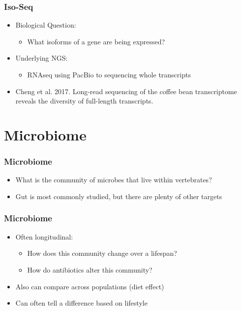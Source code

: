 \documentclass[14pt]{beamer}
\begin{document}
\begin{frame}
\frametitle{Iso-Seq}
\begin{itemize}
	\item<+-> Biological Question:
	\begin{itemize}
		\item<+-> What isoforms of a gene are being expressed?
	\end{itemize}
	\item<+-> Underlying NGS:
	\begin{itemize}
		\item<+-> RNAseq using PacBio to sequencing whole transcripts
	\end{itemize}
	\item<+-> Cheng et al. 2017. Long-read sequencing of the coffee bean transcriptome reveals the diversity of full-length transcripts.
\end{itemize}
\end{frame}

\section{Microbiome}

\begin{frame}
\frametitle{Microbiome}
\begin{itemize}
	\item<+-> What is the community of microbes that live within vertebrates?
	\item<+-> Gut is most commonly studied, but there are plenty of other targets
\end{itemize}
\end{frame}

\begin{frame}
\frametitle{Microbiome}
\begin{itemize}
	\item<+-> Often longitudinal:
	\begin{itemize}
		\item<+-> How does this community change over a lifespan?
		\item<+-> How do antibiotics alter this community?
	\end{itemize}
	\item<+-> Also can compare across populations (diet effect)
	\item<+-> Can often tell a difference based on lifestyle 
\end{itemize}
\end{frame}
\end{document}
